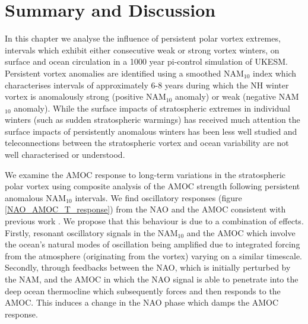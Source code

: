 
\section{Summary and Discussion}

In this chapter we analyse the influence of persistent polar vortex extremes, intervals which exhibit either consecutive weak or strong vortex winters, on surface and ocean circulation in a 1000 year pi-control simulation of UKESM. Persistent vortex anomalies are identified using a smoothed NAM$_{10}$ index which characterises intervals of approximately 6-8 years during which the NH winter vortex is anomalously strong (positive NAM$_{10}$ anomaly) or weak (negative NAM$_{10}$ anomaly). While the surface impacts of stratospheric extremes in individual winters (such as sudden stratospheric warmings) has received much attention \citep{baldwinStratospheric2001a, domeisenEstimating2019, charlton-perezInfluence2018a} the surface impacts of persistently anomalous winters has been less well studied and  teleconnections between the stratospheric vortex and ocean variability are not well characterised or understood. 

We examine the AMOC response to long-term variations in the stratospheric polar vortex using composite analysis of the AMOC strength following persistent anomalous NAM$_{10}$ intervals. We find oscillatory responses (figure \ref{NAO_AMOC_T_response}) from the NAO and the AMOC consistent with previous work  \citep{reichlerStratospheric2012}. We propose that this behaviour is due to a combination of effects. Firstly, resonant oscillatory signals in the NAM$_{10}$ and the AMOC which involve the ocean's natural modes of oscillation being amplified due to integrated forcing from the atmosphere (originating from the vortex) varying on a similar timescale. Secondly, through feedbacks between the NAO, which is initially perturbed by the NAM, and the AMOC in which the NAO signal is able to penetrate into the deep ocean thermocline which subsequently forces and then responds to the AMOC. This induces a change in the NAO phase which damps the AMOC response.

